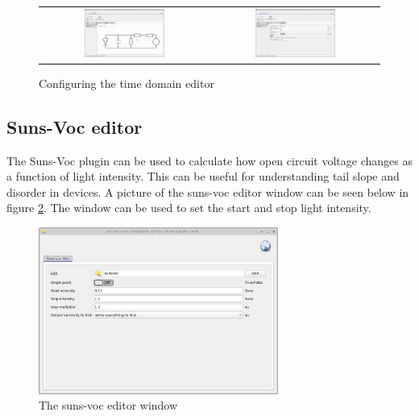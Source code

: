 \begin{figure}[H]
\centering
\begin{tabular}{ c c }

\includegraphics[width=0.5\textwidth,height=0.4\textwidth]{./images/time_domain_editor1.png}

&
\includegraphics[width=0.5\textwidth,height=0.4\textwidth]{./images/time_domain_editor4.png}

\\

\end{tabular}
\caption{Configuring the time domain editor}
\label{fig:timedomaineditor2}
\end{figure}

\subsection{Suns-Voc editor}
The Suns-Voc plugin can be used to calculate how open circuit voltage changes as a function of light intensity.  This can be useful for understanding tail slope and disorder in devices.  A picture of the suns-voc editor window can be seen below in figure \ref{fig:sunsvoceditor}.  The window can be used to set the start and stop light intensity.

\begin{figure}[H]
\centering
\includegraphics[width=0.7\textwidth,height=0.5\textwidth]{./images/suns_voc_editor.png}
\caption{The suns-voc editor window}
\label{fig:sunsvoceditor}
\end{figure}


